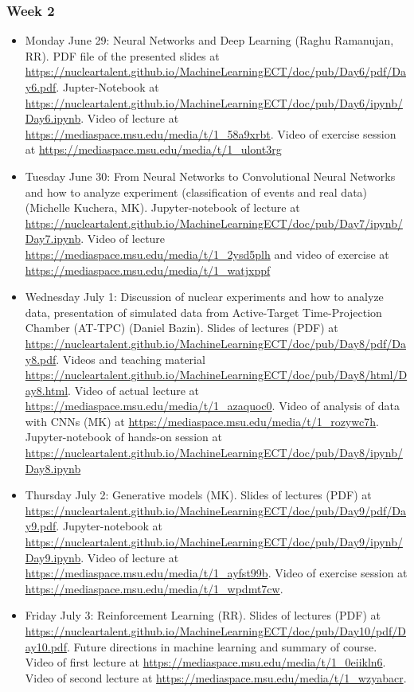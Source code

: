 \documentclass[prc,amsart,english]{revtex4}
\begin{document}
\subsubsection{Week 2}

\begin{itemize}
\item  Monday June 29:	Neural Networks and Deep Learning (Raghu Ramanujan, RR). PDF file of the presented slides at \url{https://nucleartalent.github.io/MachineLearningECT/doc/pub/Day6/pdf/Day6.pdf}. Jupter-Notebook at \url{https://nucleartalent.github.io/MachineLearningECT/doc/pub/Day6/ipynb/Day6.ipynb}. Video of lecture at \url{https://mediaspace.msu.edu/media/t/1_58a9xrbt}. Video of exercise session at \url{https://mediaspace.msu.edu/media/t/1_ulont3rg}
\item Tuesday June 30:	From Neural Networks to Convolutional Neural Networks and how to analyze experiment (classification of events and real data)	(Michelle Kuchera, MK). Jupyter-notebook of lecture at \url{https://nucleartalent.github.io/MachineLearningECT/doc/pub/Day7/ipynb/Day7.ipynb}. Video of lecture \url{https://mediaspace.msu.edu/media/t/1_2ysd5plh} and video of exercise at \url{https://mediaspace.msu.edu/media/t/1_watjxppf}
\item Wednesday July 1:	 Discussion of nuclear experiments and how to analyze data, presentation of simulated data from Active-Target Time-Projection Chamber (AT-TPC)	(Daniel Bazin). Slides of lectures (PDF) at \url{https://nucleartalent.github.io/MachineLearningECT/doc/pub/Day8/pdf/Day8.pdf}. Videos and teaching material \url{https://nucleartalent.github.io/MachineLearningECT/doc/pub/Day8/html/Day8.html}. Video of actual lecture at \url{https://mediaspace.msu.edu/media/t/1_azaquoc0}. Video of analysis of data with CNNs (MK) at \url{https://mediaspace.msu.edu/media/t/1_rozywc7h}. Jupyter-notebook of hands-on session at \url{https://nucleartalent.github.io/MachineLearningECT/doc/pub/Day8/ipynb/Day8.ipynb}
\item Thursday July 2: 	Generative models (MK). Slides of lectures (PDF) at \url{https://nucleartalent.github.io/MachineLearningECT/doc/pub/Day9/pdf/Day9.pdf}.
Jupyter-notebook at \url{https://nucleartalent.github.io/MachineLearningECT/doc/pub/Day9/ipynb/Day9.ipynb}.
Video of lecture at \url{https://mediaspace.msu.edu/media/t/1_ayfst99b}. Video of exercise session at \url{https://mediaspace.msu.edu/media/t/1_wpdmt7cw}. 
\item Friday July 3: 	Reinforcement Learning (RR). Slides of lectures (PDF) at \url{https://nucleartalent.github.io/MachineLearningECT/doc/pub/Day10/pdf/Day10.pdf}. Future directions in machine learning and summary of course. Video of first lecture at \url{https://mediaspace.msu.edu/media/t/1_0eiikln6}. Video of second lecture at \url{https://mediaspace.msu.edu/media/t/1_wzyabacr}. 
\end{itemize}
\end{document}
